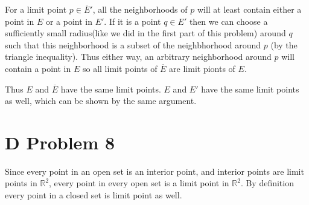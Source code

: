\documentclass{article}
\begin{document}
For a limit point $p \in \overline{E}'$, 
all the neighborhoods of $p$ will at least contain 
either a point in $E$ or a point in $E'$.
If it is a point $q \in E'$ then we can choose a sufficiently
small radius(like we did in the first part of this problem) 
around $q$ such that this neighborhood is a subset of the neighbhorhood 
around $p$ (by the triangle inequality).
Thus either way, an arbitrary neighborhood around $p$ will contain a point in $E$
so all limit points of $\overline{E}$ are limit pionts of $E$.

Thus $E$ and $\overline{E}$ have the same limit points.
$E$ and $E'$ have the same limit points as well, 
which can be shown by the same argument.
\newpage 

\section*{D Problem 8}
Since every point in an open set is an interior point,
and interior points are limit points in $\mathbb{R}^2$,
every point in every open set is a limit point in $\mathbb{R}^2$.
By definition every point in a closed set is limit point as well.
\end{document}
